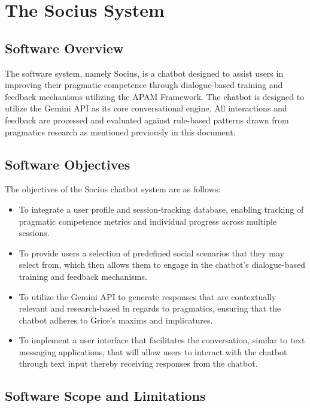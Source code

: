 \chapter{The Socius System}\label{sec:methodology}

    \section{Software Overview}

    The software system, namely Socius, is a chatbot designed to assist users in improving their pragmatic competence through dialogue-based training and feedback mechanisms utilizing the APAM Framework. The chatbot is designed to utilize the Gemini API as its core conversational engine. All interactions and feedback are processed and evaluated against rule-based patterns drawn from pragmatics research as mentioned previously in this document. 

    \section{Software Objectives}

    The objectives of the Socius chatbot system are as follows:

    \begin{itemize}
        \item To integrate a user profile and session-tracking database, enabling tracking of pragmatic competence metrics and individual progress across multiple sessions.
        \item To provide users a selection of predefined social scenarios that they may select from, which then allows them to engage in the chatbot's dialogue-based training and feedback mechanisms. 
        \item To utilize the Gemini API to generate responses that are contextually relevant and research-based in regards to pragmatics, ensuring that the chatbot adheres to Grice's maxims and implicatures.
        \item To implement a user interface that facilitates the conversation, similar to text messaging applications, that will allow users to interact with the chatbot through text input thereby receiving responses from the chatbot.
    \end{itemize}

    \section{Software Scope and Limitations}

